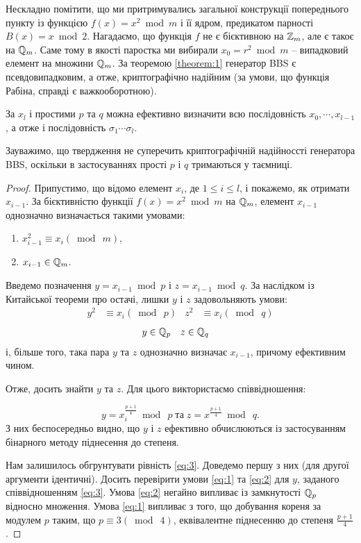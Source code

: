 Нескладно помітити, що ми притримувались загальної конструкції попереднього пункту із функцією $f(x) = x^2 \bmod m$ і її ядром, предикатом парності $B(x)=x \bmod 2$. Нагадаємо, що функція $f$ не є бієктивною на $\mathbb Z_{m}$, але є такоє на $\mathbb Q_{m}$. Саме тому в якості паростка ми вибирали $x_0=r^2 \bmod m$ -- випадковий елемент на множини $\mathbb Q_{m}$. За теоремою \eqref{theorem:1} генератор BBS є псевдовипадковим, а отже, криптографічно надійним (за умови, що функція Рабіна, справді є важкооборотною).
 
\begin{claim}
За $x_l$ і простими $p$ та $q$ можна ефективно визначити всю послідовність $x_0, \cdots , x_{l-1}$, а отже і послідовність $\sigma_1 \cdots \sigma_l$.
\end{claim} 

Зауважимо, що твердження не суперечить криптографічній надійноссті генератора BBS, оскільки в застосуваннях прості $p$ і $q$ тримаються у таємниці.

\begin{proof}
Припустимо, що відомо елемент $x_i$, де $1\leq i \leq l$, і покажемо, як отримати $x_{i-1}$. За бієктивністю функції $f(x)=x^2 \bmod m$ на $\mathbb Q_{m}$, елемент $x_{i-1}$  однозначно визначається такими умовами:
\begin{enumerate}
\item $x^2_{i-1} \equiv x_i (\bmod\: m)$,
\item $x_{i-1} \in \mathbb Q_{m}$.
\end{enumerate}
Введемо позначення $y=x_{i-1} \bmod p$ і $z=x_{i-1} \bmod q$. За наслідком із Китайської теореми про остачі, лишки $y$ і $z$ задовольняють умови:
\begin{align}\label{eq:1}
y^2 &\equiv x_i (\bmod\: p) & z^2 &\equiv x_i (\bmod\: q) 
\end{align}
\begin{align}\label{eq:2}
y & \in \mathbb Q_{p} & z & \in \mathbb Q_{q} 
\end{align}
і, більше того, така пара $y$ та $z $ однозначно визначає $x_{i-1}$, причому ефективним чином. \par
Отже, досить знайти $y $ та $z$. Для цього виктористаємо співвідношення:

\begin{equation}\label{eq:3}
y = x^{\frac{p+1}{4}}_i \bmod \: p \; \text{та} \; z=x^{\frac{p+1}{4}} \bmod \: q .
\end{equation}
З них беспосередньо видно, що $y$ і $z$ ефективно обчислюються із застосуванням бінарного методу піднесення до степеня. \par 
Нам залишилось обгрунтувати рівність \eqref{eq:3}. Доведемо першу з них (для другої аргументи ідентичні). Досить перевірити умови \eqref{eq:1} та \eqref{eq:2} для $y$, заданого співвідношенням \eqref{eq:3}. Умова \eqref{eq:2} негайно випливає із замкнутості $\mathbb Q_{p}$ відносно множення. Умова \eqref{eq:1} випливає з того, що добування кореня за модулем $p$ таким, що $p \equiv 3(\bmod \: 4)$, еквівалентне піднесенню до степеня $\frac{p+1}{4}$. 

\end{proof}
